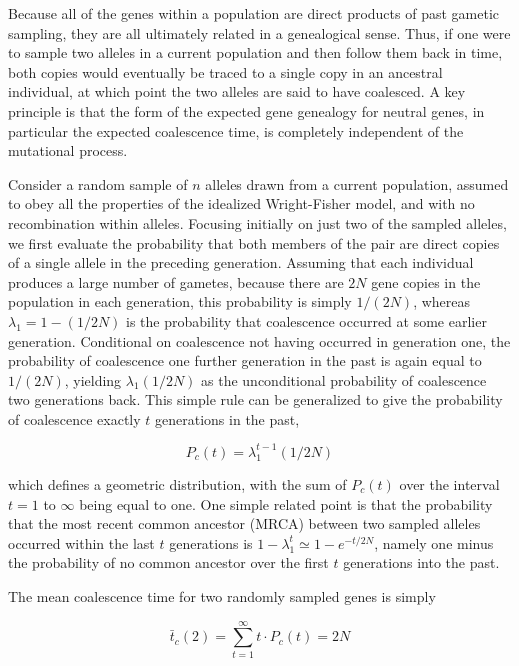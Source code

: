 \documentclass{article}
\begin{document}
Because all of the genes within a population are direct products of past gametic sampling, they are all ultimately related in a genealogical sense. Thus, if one were to sample two alleles in a current population and then follow them back in time, both copies would eventually be traced to a single copy in an ancestral individual, at which point the two alleles are said to have coalesced. A key principle is that the form of the expected gene genealogy for neutral genes, in particular the expected coalescence time, is completely independent of the mutational process.

Consider a random sample of $n$ alleles drawn from a current population, assumed to obey all the properties of the idealized Wright-Fisher model, and with no recombination within alleles. Focusing initially on just two of the sampled alleles, we first evaluate the probability that both members of the pair are direct copies of a single allele in the preceding generation. Assuming that each individual produces a large number of gametes, because there are $2N$ gene copies in the population in each generation, this probability is simply $1/(2N)$, whereas $\lambda_1 = 1 - (1/2N)$ is the probability that coalescence occurred at some earlier generation. Conditional on coalescence not having occurred in generation one, the probability of coalescence one further generation in the past is again equal to $1/(2N)$, yielding $\lambda_1(1/2N)$ as the unconditional probability of coalescence two generations back. This simple rule can be generalized to give the probability of coalescence exactly $t$ generations in the past,

\begin{equation}
P_{c}(t)=\lambda_{1}^{t-1}(1/2N)
\tag{2.37}
\label{eq:2_37}
\end{equation}

which defines a geometric distribution, with the sum of  $ P_c(t) $ over the interval  $ t = 1 $ to  $ \infty $ being equal to one. One simple related point is that the probability that the most recent common ancestor (MRCA) between two sampled alleles occurred within the last  $ t $ generations is  $ 1 - \lambda_1^t \simeq 1 - e^{-t/2N} $, namely one minus the probability of no common ancestor over the first  $ t $ generations into the past.

The mean coalescence time for two randomly sampled genes is simply

\begin{equation}
\bar{t}_{c}(2)=\sum_{t=1}^{\infty}t\cdot P_{c}(t)=2N
\tag{2.38}
\label{eq:2_38}
\end{equation}
\end{document}
